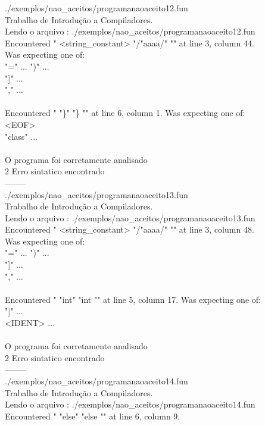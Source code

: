 \documentclass[
	article,			%
	11pt,				%
	oneside,			%
	a4paper,			%
	portuguese,			%
	brazil,				%
	sumario=tradicional
	]{abntex2}
\begin{document}
./exemplos/nao\_aceitos/programanaoaceito12.fun\\
Trabalho de Introdução a Compiladores.\\
Lendo o arquivo : ./exemplos/nao\_aceitos/programanaoaceito12.fun\\
Encountered " <string\_constant> "/"aaaa/" "" at line 3, column 44.\\
Was expecting one of:\\
    "=" ...
    ")" ...\\
    "]" ...\\
    "," ...\\
\\
Encountered " "\}" "\} "" at line 6, column 1.
Was expecting one of:\\
    <EOF>\\
    "class" ...\\
\\
O programa foi corretamente analisado\\
2 Erro sintatico encontrado\\
--------\\
./exemplos/nao\_aceitos/programanaoaceito13.fun\\
Trabalho de Introdução a Compiladores.\\
Lendo o arquivo : ./exemplos/nao\_aceitos/programanaoaceito13.fun\\
Encountered " <string\_constant> "/"aaaa/" "" at line 3, column 48.\\
Was expecting one of:\\
    "=" ...
    ")" ...\\
    "]" ...\\
    "," ...\\
\\
Encountered " "int" "int "" at line 5, column 17.
Was expecting one of:\\
    "]" ...\\
    <IDENT> ...\\
\\
O programa foi corretamente analisado\\
2 Erro sintatico encontrado\\
--------\\
./exemplos/nao\_aceitos/programanaoaceito14.fun\\
Trabalho de Introdução a Compiladores.\\
Lendo o arquivo : ./exemplos/nao\_aceitos/programanaoaceito14.fun\\
Encountered " "else" "else "" at line 6, column 9.\\
\end{document}
